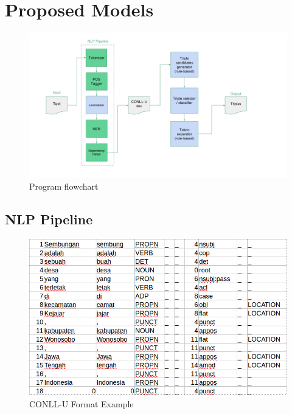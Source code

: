 \documentclass[conference,compsoc]{IEEEtran}
\begin{document}
\section{Proposed Models}

\begin{figure}[!t]
\centering
\includegraphics[width=\textwidth]{program_flowchart}
\caption{Program flowchart}
\label{fig_program_flowchart}
\end{figure}

%
%

\lipsum[1]

\subsection{NLP Pipeline}

\lipsum[3-5]

\begin{figure}
\centering
\includegraphics[scale=0.35]{conllu_example}
\caption{CONLL-U Format Example}
\label{fig_conllu_example}
\end{figure}
\end{document}
